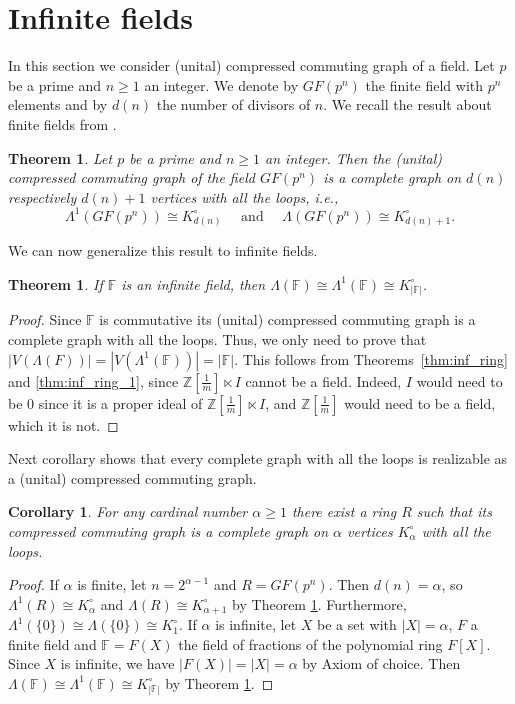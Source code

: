 \documentclass[12pt,a4paper]{amsart}
\newtheorem{corollary}[proposition]{Corollary}
\newtheorem{theorem}[proposition]{Theorem}
\theoremstyle{definition}
\newcommand{\F}{{\mathbb F}}
\newcommand{\Z}{\mathbb{Z}}
\begin{document}
\section{Infinite fields}\label{sec:fields}

In this section we consider (unital) compressed commuting graph of a field. Let $p$ be a prime and $n \ge 1$ an integer. We denote by $GF(p^n)$ the finite field with $p^n$ elements and by $d(n)$ the number of divisors of $n$. We recall the result about finite fields from \cite{BoDoKoSt23}.

\begin{theorem}\label{th:field}
Let $p$ be a prime and $n \ge 1$ an integer. Then the (unital) compressed commuting graph of the field $GF(p^n)$ is a complete graph on $d(n)$ respectively $d(n)+1$
vertices with all the loops, i.e.,
$$ \Lambda^1(GF(p^n)) \cong K_{d(n)}^\circ \quad\text{ and }\quad \Lambda(GF(p^n)) \cong K_{d(n)+1}^\circ. $$
\end{theorem}

We can now generalize this result to infinite fields. 

\begin{theorem}\label{thm:inf_field}
    If $\F$ is an infinite field, then $\Lambda(\F) \cong \Lambda^1(\F) \cong K_{|\F|}^\circ$.
\end{theorem}

\begin{proof}
    Since $\F$ is commutative its (unital) compressed commuting graph is a complete graph with all the loops.
    Thus, we only need to prove that $|V(\Lambda(F))|=|V(\Lambda^1(\F))|=|\F|$.
    This follows from Theorems~\ref{thm:inf_ring} and \ref{thm:inf_ring_1}, since $\Z[\frac1m] \ltimes I$ cannot be a field.
    Indeed, $I$ would need to be $0$ since it is a proper ideal of $\Z[\frac1m] \ltimes I$, and $\Z[\frac1m]$ would need to be a field, which it is not.
\end{proof}

Next corollary shows that every complete graph with all the loops is realizable as a (unital) compressed commuting graph. 

\begin{corollary}
For any cardinal number $\alpha \ge 1$  there exist a ring $R$ such that its compressed commuting graph is a complete graph on $\alpha$ vertices $K_\alpha^\circ$ with all the loops. 
\end{corollary}

\begin{proof}
If $\alpha$ is finite, let $n= 2^{\alpha-1}$  and $R=GF(p^n)$. Then $d(n) = \alpha$, so $\Lambda^1(R) \cong K_\alpha^\circ$ and $\Lambda(R) \cong K_{ \alpha+1}^\circ$ by Theorem \ref{th:field}. Furthermore, $\Lambda^1(\{0\}) \cong \Lambda(\{0\}) \cong K_1^\circ$. If $\alpha$ is infinite, let $X$ be a set with $|X| = \alpha$, $F$ a finite field and $\F = F(X)$ the field of fractions of the polynomial ring $F[X]$. Since $X$ is infinite, we have $|F(X)| = |X|= \alpha$ by Axiom of choice. Then $\Lambda(\F) \cong \Lambda^1(\F) \cong K_{|\F|}^\circ$ by Theorem \ref{thm:inf_field}.
\end{proof}
\end{document}
